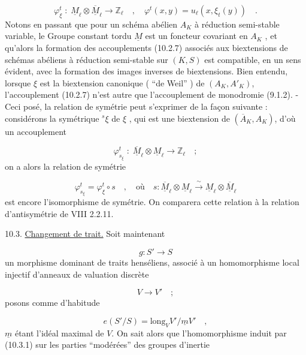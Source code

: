 \begin{equation}\tag{10.2.7}
\varphi^t_\xi \; : \; \underline{M}_\ell \otimes \overline{\underline{M}}_\ell \longrightarrow \mathbb{Z}_\ell \quad , \quad \varphi^t(x,y) = u_\ell(x,\xi_t(y)) \quad .
\end{equation}
Notons en passant que pour un schéma abélien $A_K$ à réduction semi-stable variable, le Groupe constant tordu $\underline{M}$ est un foncteur covariant en $A_K$ , et qu'alors la formation des accouplements (10.2.7) associés aux biextensions de schémas abéliens à réduction semi-stable sur $(K,S)$ est compatible, en un sens évident, avec la formation des images inverses de biextensions. Bien entendu, lorsque $\xi$ est la biextension canonique ( ``de Weil'' ) de $(A_K , A'_K)$, l'accouplement (10.2.7) n'est autre que l'accouplement de monodromie (9.1.2). - Ceci posé, la relation de symétrie peut s'exprimer de la façon suivante : considérons la symétrique ${}^{s}\xi$ de $\xi$ , qui est une biextension de $(\overline{A}_K,A_K)$, d'où un accouplement

\begin{equation*}
\varphi^t_{s_\xi} \; : \; \overline{\underline{M}}_\ell \otimes \underline{M}_\ell \longrightarrow \mathbb{Z}_\ell \quad ;
\end{equation*}
on a alors la relation de symétrie

\begin{equation}\tag{10.2.8}
\varphi^t_{s_\xi} = \varphi^t_\xi \circ s \quad , \quad \text{où} \quad s: \overline{\underline{M}}_\ell \otimes \underline{M}_\ell \xrightarrow{\ \sim\ } \underline{M}_\ell \otimes \overline{\underline{M}}_\ell
\end{equation}
est encore l'isomorphisme de symétrie. On comparera cette relation à la relation d'antisymétrie de VIII 2.2.11.




10.3. \underline{Changement de trait.} Soit maintenant

\begin{equation}\tag{10.3.1}
g: S' \longrightarrow S
\end{equation}
un morphisme dominant de traits henséliens, associé à un homomorphisme local injectif d'anneaux de valuation discrète

\begin{equation*}
V \longrightarrow V' \quad ;
\end{equation*}
posons comme d'habitude

\begin{equation}\tag{10.3.2}
e(S'/S) = \mathrm{long}_V V'/\underline{m}V' \quad ,
\end{equation}
$\underline{m}$ étant l'idéal maximal de $V$. On sait alors que l'homomorphisme induit par (10.3.1) sur les parties ``modérées'' des groupes d'inertie

